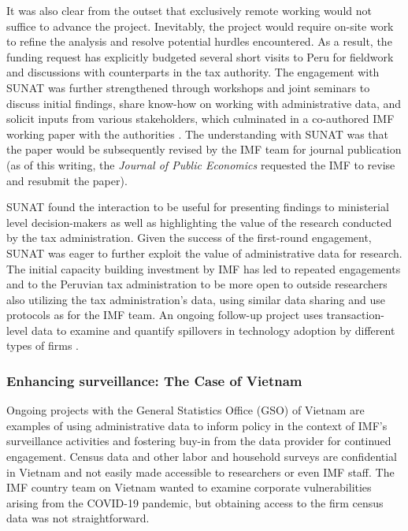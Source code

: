 It was also clear from the outset that exclusively remote working would not suffice to advance the project. Inevitably, the project would require on-site work to refine the analysis and resolve potential hurdles encountered. As a result, the funding request has explicitly budgeted several short visits to Peru for fieldwork and discussions with counterparts in the tax authority. The engagement with SUNAT was further strengthened through workshops and joint seminars to discuss initial findings, share know-how on working with administrative data, and solicit inputs from various stakeholders, which culminated in a co-authored IMF working paper with the authorities \citep{bellon2019}. The understanding with SUNAT was that the paper would be subsequently revised by the IMF team for journal publication (as of this writing, the \emph{Journal of Public Economics} requested the IMF to revise and resubmit the paper).

SUNAT found the interaction to be useful for presenting findings to ministerial level decision-makers as well as highlighting the value of the research conducted by the tax administration. Given the success of the first-round engagement, SUNAT was eager to further exploit the value of administrative data for research. The initial capacity building investment by IMF has led to repeated engagements and to the Peruvian tax administration to be more open to outside researchers also utilizing the tax administration's data, using similar data sharing and use protocols as for the IMF team. An ongoing follow-up project uses transaction-level data to examine and quantify spillovers in technology adoption by different types of firms \citep{holtsmark2020}.

\hypertarget{enhancing-surveillance-the-case-of-vietnam}{%
\subsubsection{Enhancing surveillance: The Case of Vietnam}\label{enhancing-surveillance-the-case-of-vietnam}}

Ongoing projects with the General Statistics Office (GSO) of Vietnam are examples of using administrative data to inform policy in the context of IMF's surveillance activities and fostering buy-in from the data provider for continued engagement. Census data and other labor and household surveys are confidential in Vietnam and not easily made accessible to researchers or even IMF staff. The IMF country team on Vietnam wanted to examine corporate vulnerabilities arising from the COVID-19 pandemic, but obtaining access to the firm census data was not straightforward.

